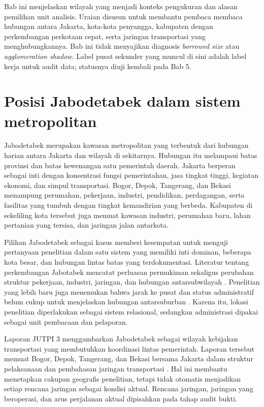 \documentclass[11pt,a4paper,oneside,openany,indonesian]{report}
\begin{document}
Bab ini menjelaskan wilayah yang menjadi konteks pengukuran dan alasan pemilihan unit analisis. Uraian disusun untuk membantu pembaca membaca hubungan antara Jakarta, kota-kota penyangga, kabupaten dengan perkembangan perkotaan cepat, serta jaringan transportasi yang menghubungkannya. Bab ini tidak menyajikan diagnosis \emph{borrowed size} atau \emph{agglomeration shadow}. Label pusat sekunder yang muncul di sini adalah label kerja untuk audit data; statusnya diuji kembali pada Bab 5.

\section{Posisi Jabodetabek dalam sistem metropolitan}

Jabodetabek merupakan kawasan metropolitan yang terbentuk dari hubungan harian antara Jakarta dan wilayah di sekitarnya. Hubungan itu melampaui batas provinsi dan batas kewenangan satu pemerintah daerah. Jakarta berperan sebagai inti dengan konsentrasi fungsi pemerintahan, jasa tingkat tinggi, kegiatan ekonomi, dan simpul transportasi. Bogor, Depok, Tangerang, dan Bekasi menampung perumahan, pekerjaan, industri, pendidikan, perdagangan, serta fasilitas yang tumbuh dengan tingkat kemandirian yang berbeda. Kabupaten di sekeliling kota tersebut juga memuat kawasan industri, perumahan baru, lahan pertanian yang tersisa, dan jaringan jalan antarkota.

Pilihan Jabodetabek sebagai kasus memberi kesempatan untuk menguji pertanyaan penelitian dalam satu sistem yang memiliki inti dominan, beberapa kota besar, dan hubungan lintas batas yang terdokumentasi. Literatur tentang perkembangan Jabotabek mencatat perluasan permukiman sekaligus perubahan struktur pekerjaan, industri, jaringan, dan hubungan antarsubwilayah \parencite{henderson1996,hudalahfirman2012,hudalahetal2013}. Penelitian yang lebih baru juga menemukan bahwa jarak ke pusat dan status administratif belum cukup untuk menjelaskan hubungan antarsuburban \parencite{sadewoetal2023,aritenang2023}. Karena itu, lokasi penelitian diperlakukan sebagai sistem relasional, sedangkan administrasi dipakai sebagai unit pembacaan dan pelaporan.

Laporan JUTPI 3 menggambarkan Jabodetabek sebagai wilayah kebijakan transportasi yang membutuhkan koordinasi lintas pemerintah. Laporan tersebut memuat Bogor, Depok, Tangerang, dan Bekasi bersama Jakarta dalam struktur pelaksanaan dan pembahasan jaringan transportasi \parencite{jica2025jutpi}. Hal ini membantu menetapkan cakupan geografis penelitian, tetapi tidak otomatis menjadikan setiap rencana jaringan sebagai kondisi aktual. Rencana jaringan, jaringan yang beroperasi, dan arus perjalanan aktual dipisahkan pada tahap audit bukti.
\end{document}
